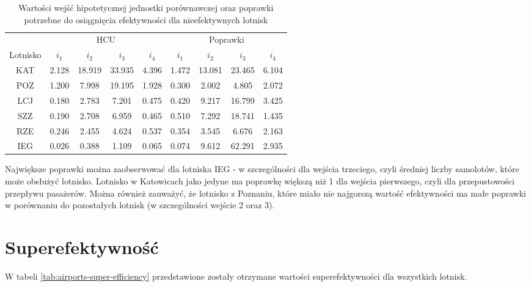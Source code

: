 \documentclass[a4paper,12pt]{article}
\begin{document}
\begin{table}[H]
    \centering
    \begin{tabular}{c|cccc|cccc}
    \hline
        & \multicolumn{4}{c|}{HCU} & \multicolumn{4}{c}{Poprawki}  \\
         Lotnisko & $i_1$ & $i_2$ & $i_3$ & $i_4$ & $i_1$ & $i_2$ & $i_3$ & $i_4$ \\ \hline
        KAT & 2.128 & 18.919 & 33.935 & 4.396 & 1.472 & 13.081 & 23.465 & 6.104 \\
        POZ & 1.200 & 7.998 & 19.195 & 1.928 & 0.300 & 2.002 & 4.805 & 2.072 \\
        LCJ & 0.180 & 2.783 & 7.201 & 0.475 & 0.420 & 9.217 & 16.799 & 3.425 \\
        SZZ & 0.190 & 2.708 & 6.959 & 0.465 & 0.510 & 7.292 & 18.741 & 1.435 \\
        RZE & 0.246 & 2.455 & 4.624 & 0.537 & 0.354 & 3.545 & 6.676 & 2.163 \\
        IEG & 0.026 & 0.388 & 1.109 & 0.065 & 0.074 & 9.612 & 62.291 & 2.935 \\    
    \hline
    \end{tabular}
    \caption{Wartości wejść hipotetycznej jednostki porównawczej oraz poprawki potrzebne do osiągnięcia efektywności dla nieefektywnych lotnisk }
    \label{tab:airports-hcu-and-improvements}
\end{table}

\noindent Największe poprawki można zaobserwować dla lotniska IEG - w szczególności dla wejścia trzeciego, czyli średniej liczby samolotów, które może obsłużyć lotnisko.
Lotnisko w Katowicach jako jedyne ma poprawkę większą niż 1 dla wejścia pierwszego, czyli dla przepustowości przepływu pasażerów. 
Można również zauważyć, że lotnisko z Poznaniu, które miało nie najgorszą wartość efektywności ma małe poprawki w porównaniu do pozostałych lotnisk (w szczególności wejście 2 oraz 3).

\section{Superefektywność}

W tabeli \ref{tab:airports-super-efficiency} przedstawione zostały otrzymane wartości superefektywności dla wszystkich lotnisk.
\end{document}
